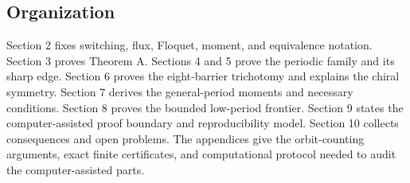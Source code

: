 \subsection{Organization}

Section 2 fixes switching, flux, Floquet, moment, and equivalence notation.
Section 3 proves Theorem A. Sections 4 and 5 prove the periodic family and its
sharp edge. Section 6 proves the eight-barrier trichotomy and explains the
chiral symmetry. Section 7 derives the general-period moments and necessary
conditions. Section 8 proves the bounded low-period frontier. Section 9 states
the computer-assisted proof boundary and reproducibility model. Section 10
collects consequences and open problems. The appendices give the orbit-counting
arguments, exact finite certificates, and computational protocol needed to
audit the computer-assisted parts.
